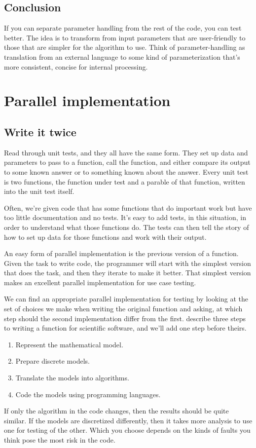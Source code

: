 \documentclass[fleqn,10pt]{olplainarticle}
\begin{document}
\subsection{Conclusion}
If you can separate parameter handling from the rest of the code,
you can test better. The idea is to transform from input parameters
that are user-friendly to those that are simpler for the algorithm
to use.
Think of parameter-handling as translation from an external
     language to some kind of parameterization that's more
     consistent, concise for internal processing.




\section{Parallel implementation}\label{sec:parallel-implementation}
\subsection{Write it twice}\label{sec:parallel-twice}
Read through unit tests, and they all have the same form.
They set up data and parameters to pass to a function, call the
function, and either compare its output to some known answer or to
something known about the answer. Every unit test is two
functions, the function under test and a parable
of that function, written into the unit test itself.

Often, we're given code that has some functions that do important
work but have too little documentation and no tests. It's easy
to add tests, in this situation, in order to understand what
those functions do. The tests can then tell the story of how
to set up data for those functions and work with their output.

An easy form of parallel implementation is the previous version
of a function. Given the task to write code, the programmer will
start with the simplest version that does the task, and then they
iterate to make it better. That simplest version makes an excellent
parallel implementation for use case testing.

We can find an appropriate parallel implementation for testing by
looking at the set of choices we make when writing the original function
and asking, at which step should the second implementation differ
from the first.
\cite{dahlgren2005} describe three steps to writing a function for
scientific software, and we'll add one step before theirs.
\begin{enumerate}
  \item Represent the mathematical model.
  \item Prepare discrete models.
  \item Translate the models into algorithms.
  \item Code the models using programming languages.
\end{enumerate}
If only the algorithm in the code changes, then the results
should be quite similar. If the models are discretized differently,
then it takes more analysis to use one for testing of the other.
Which you choose depends on the kinds of faults you think pose
the most risk in the code.
\end{document}
